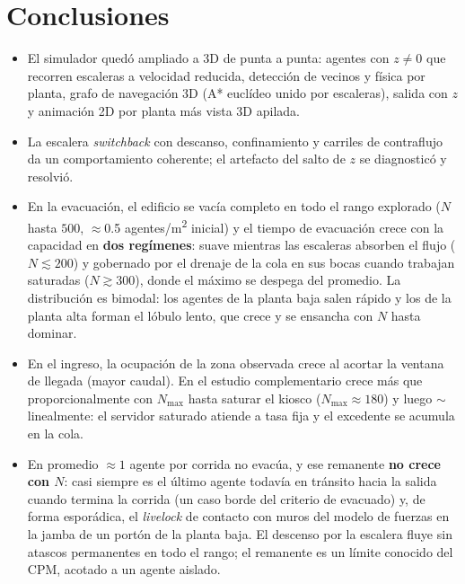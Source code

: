 \documentclass[11pt,a4paper]{article}
\begin{document}
\section{Conclusiones}
\label{sec:conclusiones}

\begin{itemize}
  \item El simulador quedó ampliado a 3D de punta a punta: agentes con $z\neq 0$ que recorren
  escaleras a velocidad reducida, detección de vecinos y física por planta, grafo de navegación
  3D (A* euclídeo unido por escaleras), salida con $z$ y animación 2D por planta más vista 3D
  apilada.
  \item La escalera \emph{switchback} con descanso, confinamiento y carriles de contraflujo da
  un comportamiento coherente; el artefacto del salto de $z$ se diagnosticó y resolvió.
  \item En la evacuación, el edificio se vacía completo en todo el rango explorado
  ($N$ hasta $500$, $\approx$0.5 agentes/\si{\metre\squared} inicial) y el tiempo de evacuación
  crece con la capacidad en \textbf{dos regímenes}: suave mientras las escaleras absorben el
  flujo ($N\lesssim 200$) y gobernado por el drenaje de la cola en sus bocas cuando trabajan
  saturadas ($N\gtrsim 300$), donde el máximo se despega del promedio. La distribución es
  bimodal: los agentes de la planta baja salen rápido y los de la planta alta forman el
  lóbulo lento, que crece y se ensancha con $N$ hasta dominar.
  \item En el ingreso, la ocupación de la zona observada crece al acortar la ventana de llegada
  (mayor caudal). En el estudio complementario crece más que proporcionalmente con $N_{\max}$
  hasta saturar el kiosco ($N_{\max}\approx 180$) y luego $\sim$linealmente: el servidor
  saturado atiende a tasa fija y el excedente se acumula en la cola.
  \item En promedio $\approx 1$ agente por corrida no evacúa, y ese remanente \textbf{no crece
  con $N$}: casi siempre es el último agente todavía en tránsito hacia la salida cuando termina
  la corrida (un caso borde del criterio de evacuado) y, de forma esporádica, el \emph{livelock}
  de contacto con muros del modelo de fuerzas en la jamba de un portón de la planta baja. El
  descenso por la escalera fluye sin atascos permanentes en todo el rango; el remanente es un
  límite conocido del CPM, acotado a un agente aislado.
\end{itemize}
\end{document}
